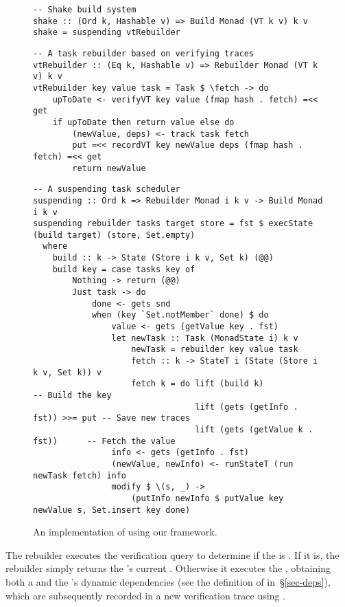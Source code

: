 \begin{figure}
\begin{verbatim}
-- Shake build system
shake :: (Ord k, Hashable v) => Build Monad (VT k v) k v
shake = suspending vtRebuilder
\end{verbatim}
\vspace{0mm}
\begin{verbatim}
-- A task rebuilder based on verifying traces
vtRebuilder :: (Eq k, Hashable v) => Rebuilder Monad (VT k v) k v
vtRebuilder key value task = Task $ \fetch -> do
    upToDate <- verifyVT key value (fmap hash . fetch) =<< get
    if upToDate then return value else do
        (newValue, deps) <- track task fetch
        put =<< recordVT key newValue deps (fmap hash . fetch) =<< get
        return newValue
\end{verbatim}
\vspace{0mm}
\begin{verbatim}
-- A suspending task scheduler
suspending :: Ord k => Rebuilder Monad i k v -> Build Monad i k v
suspending rebuilder tasks target store = fst $ execState (build target) (store, Set.empty)
  where
    build :: k -> State (Store i k v, Set k) (@@)
    build key = case tasks key of
        Nothing -> return (@@)
        Just task -> do
            done <- gets snd
            when (key `Set.notMember` done) $ do
                value <- gets (getValue key . fst)
                let newTask :: Task (MonadState i) k v
                    newTask = rebuilder key value task
                    fetch :: k -> StateT i (State (Store i k v, Set k)) v
                    fetch k = do lift (build k)                      -- Build the key
                                 lift (gets (getInfo . fst)) >>= put -- Save new traces
                                 lift (gets (getValue k . fst))      -- Fetch the value
                info <- gets (getInfo . fst)
                (newValue, newInfo) <- runStateT (run newTask fetch) info
                modify $ \(s, _) ->
                    (putInfo newInfo $ putValue key newValue s, Set.insert key done)
\end{verbatim}
\vspace{-3mm}
\caption{An implementation of \Shake using our framework.}\label{fig-shake-implementation}
\vspace{-6mm}
\end{figure}

The rebuilder executes the verification query  to determine if the
 is . If it is, the rebuilder simply returns the 's
current . Otherwise it executes the , obtaining both a
 and the 's dynamic dependencies  (see the
definition of  in~\S\ref{sec-deps}), which are subsequently recorded
in a new verification trace using .

